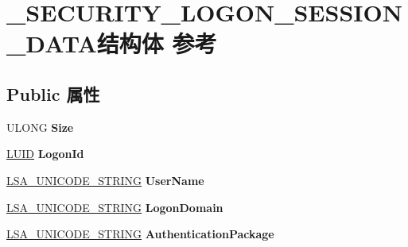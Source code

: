 \hypertarget{struct___s_e_c_u_r_i_t_y___l_o_g_o_n___s_e_s_s_i_o_n___d_a_t_a}{}\section{\+\_\+\+S\+E\+C\+U\+R\+I\+T\+Y\+\_\+\+L\+O\+G\+O\+N\+\_\+\+S\+E\+S\+S\+I\+O\+N\+\_\+\+D\+A\+T\+A结构体 参考}
\label{struct___s_e_c_u_r_i_t_y___l_o_g_o_n___s_e_s_s_i_o_n___d_a_t_a}
\subsection*{Public 属性}
\begin{DoxyCompactItemize}
\item 
\mbox{\label{struct___s_e_c_u_r_i_t_y___l_o_g_o_n___s_e_s_s_i_o_n___d_a_t_a_aa5ecfcc291194d72062a8effce02da98}} 
U\+L\+O\+NG {\bfseries Size}
\item 
\mbox{\label{struct___s_e_c_u_r_i_t_y___l_o_g_o_n___s_e_s_s_i_o_n___d_a_t_a_aeee167eb67d7efdfd024977a29d431fd}} 
\hyperlink{struct___l_u_i_d}{L\+U\+ID} {\bfseries Logon\+Id}
\item 
\mbox{\label{struct___s_e_c_u_r_i_t_y___l_o_g_o_n___s_e_s_s_i_o_n___d_a_t_a_a8cb7fa8dfa2ccc44b521dc5f6073e700}} 
\hyperlink{struct___l_s_a___u_n_i_c_o_d_e___s_t_r_i_n_g}{L\+S\+A\+\_\+\+U\+N\+I\+C\+O\+D\+E\+\_\+\+S\+T\+R\+I\+NG} {\bfseries User\+Name}
\item 
\mbox{\label{struct___s_e_c_u_r_i_t_y___l_o_g_o_n___s_e_s_s_i_o_n___d_a_t_a_a5575f39731e37b7717753cd364ec80c7}} 
\hyperlink{struct___l_s_a___u_n_i_c_o_d_e___s_t_r_i_n_g}{L\+S\+A\+\_\+\+U\+N\+I\+C\+O\+D\+E\+\_\+\+S\+T\+R\+I\+NG} {\bfseries Logon\+Domain}
\item 
\mbox{\label{struct___s_e_c_u_r_i_t_y___l_o_g_o_n___s_e_s_s_i_o_n___d_a_t_a_a8dabe2e9bee9be28494842a81256e541}} 
\hyperlink{struct___l_s_a___u_n_i_c_o_d_e___s_t_r_i_n_g}{L\+S\+A\+\_\+\+U\+N\+I\+C\+O\+D\+E\+\_\+\+S\+T\+R\+I\+NG} {\bfseries Authentication\+Package}

\end{DoxyCompactItemize}
